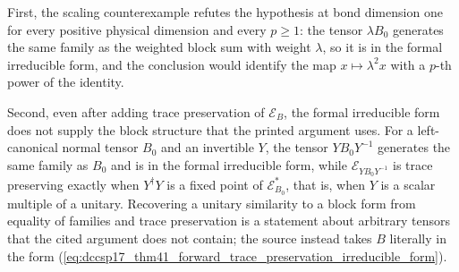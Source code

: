 \documentclass{article}
\begin{document}
First, the scaling counterexample refutes the hypothesis at bond dimension
one for every positive physical dimension and every $p\geq1$: the tensor
$\lambda B_0$ generates the same family as the weighted block sum with weight
$\lambda$, so it is in the formal irreducible form, and the conclusion would
identify the map $x\mapsto\lambda^2x$ with a $p$-th power of the identity.

Second, even after adding trace preservation of $\mathcal E_B$, the formal
irreducible form does not supply the block structure that the printed
argument uses. For a left-canonical normal tensor $B_0$ and an invertible
$Y$, the tensor $YB_0Y^{-1}$ generates the same family as $B_0$ and is in the
formal irreducible form, while
$\mathcal E_{YB_0Y^{-1}}$ is trace preserving exactly when $Y^\dagger Y$ is a
fixed point of $\mathcal E_{B_0}^*$, that is, when $Y$ is a scalar multiple of
a unitary. Recovering a unitary similarity to a block form from equality of
families and trace preservation is a statement about arbitrary tensors that
the cited argument does not contain; the source instead takes $B$ literally
in the form
(\ref{eq:dccsp17_thm41_forward_trace_preservation_irreducible_form}).
\end{document}
